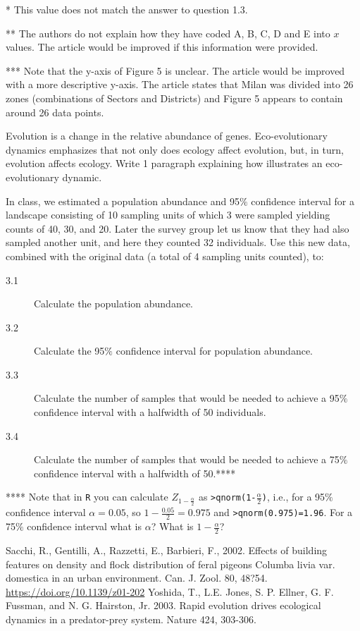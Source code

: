 \documentclass[11pt, oneside]{article}   	%
\begin{document}
* This value does not match the answer to question 1.3.

** The authors do not explain how they have coded A, B, C, D and E into $x$ values. The article would be improved if this information were provided.

*** Note that the y-axis of Figure 5 is unclear. The article would be improved with a more descriptive y-axis. The article states that Milan was divided into 26 zones (combinations of Sectors and Districts) and Figure 5 appears to contain around 26 data points.

\vspace{2cm}

\begin{description}
\item[2.1] Evolution is a change in the relative abundance of genes. Eco-evolutionary dynamics emphasizes that not only does ecology affect evolution, but, in turn, evolution affects ecology. Write 1 paragraph explaining how \cite{Yoshida} illustrates an eco-evolutionary dynamic.
\item 
\end{description}

In class, we estimated a population abundance and 95$\%$ confidence interval for a landscape consisting of 10 sampling units of which 3 were sampled yielding counts of 40, 30, and 20. Later the survey group let us know that they had also sampled another unit, and here they counted 32 individuals. Use this new data, combined with the original data (a total of 4 sampling units counted), to:

\begin{description}
\item[3.1] Calculate the population abundance.
\item[3.2] Calculate the 95$\%$ confidence interval for population abundance.
\item[3.3] Calculate the number of samples that would be needed to achieve a 95$\%$ confidence interval with a halfwidth of 50 individuals.
\item[3.4] Calculate the number of samples that would be needed to achieve a 75$\%$ confidence interval with a halfwidth of 50.****
\end{description}
**** Note that in \texttt{R} you can calculate $Z_{1-\frac{\alpha}{2}}$ as \texttt{>qnorm(1-$\frac{\alpha}{2}$)}, i.e., for a 95$\%$ confidence interval $\alpha = 0.05$, so $1-\frac{0.05}{2} = 0.975$ and \texttt{>qnorm(0.975)=1.96}. For a 75$\%$ confidence interval what is $\alpha$? What is $1-\frac{\alpha}{2}$?

\begin{thebibliography}{10}
 Sacchi, R., Gentilli, A., Razzetti, E., Barbieri, F., 2002. Effects of building features on density and flock distribution of feral pigeons Columba livia var. domestica in an urban environment. Can. J. Zool. 80, 48?54. \url{https://doi.org/10.1139/z01-202}
 Yoshida, T., L.E. Jones, S. P. Ellner, G. F. Fussman, and N. G. Hairston, Jr. 2003. Rapid evolution drives ecological dynamics in a predator-prey system. Nature 424, 303-306.
\end{thebibliography}
\end{document}
